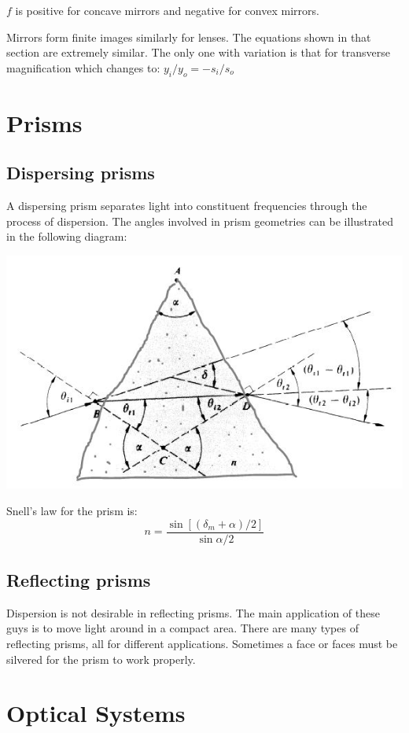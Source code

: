\documentclass[12pt]{report}
\begin{document}
$f$ is positive for concave mirrors and negative for convex mirrors. 

Mirrors form finite images similarly for lenses. The equations shown in that section are extremely similar. The only one with variation is that for transverse magnification which changes to: $y_i/y_o=-s_i/s_o$

\section{Prisms}
\subsection{Dispersing prisms}
A dispersing prism separates light into constituent frequencies through the process of dispersion. The angles involved in prism geometries can be illustrated in the following diagram:

\includegraphics[scale=.5]{DispersingPrism.jpg}

Snell's law for the prism is:
\begin{equation}
n = \frac{\sin [(\delta_m+\alpha)/2]}{\sin \alpha/2}
\end{equation}
\subsection{Reflecting prisms}
Dispersion is not desirable in reflecting prisms. The main application of these guys is to move light around in a compact area. There are many types of reflecting prisms, all for different applications. Sometimes a face or faces must be silvered for the prism to work properly. 

\section{Optical Systems}
\end{document}
